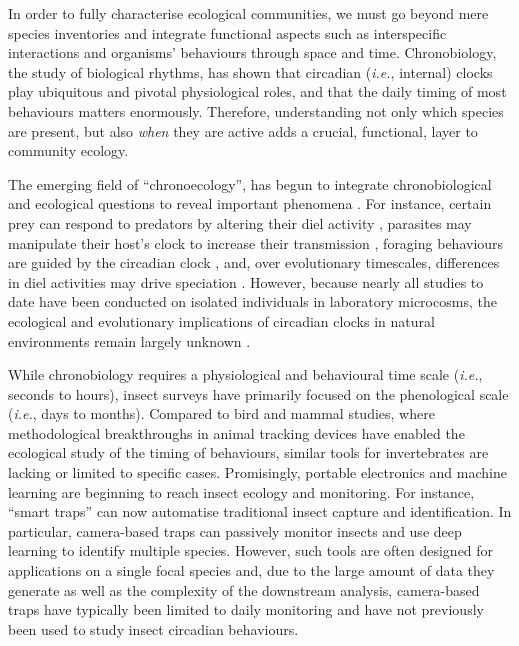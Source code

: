 \documentclass[12pt]{article}
\begin{document}
\begin{linenumbers}
		In order to fully characterise ecological communities, we must go beyond mere species inventories and integrate functional aspects such as interspecific interactions and organisms’ behaviours through space and time\cite{bro-jorgensen_linking_2019, cordero-rivera_behavioral_2017}. %
		Chronobiology, the study of biological rhythms, has shown that circadian (\emph{i.e.}, internal) clocks play ubiquitous and pivotal physiological roles, and that the daily timing of most behaviours matters enormously\cite{patke_molecular_2020}. Therefore, understanding not only which species are present, but also \emph{when} they are active adds a crucial, functional, layer to community ecology.
		
		The emerging field of “chronoecology”, has begun to integrate chronobiological and ecological questions to reveal important phenomena \cite{halle_chronoecology_2000,helm_two_2017}. For instance, certain prey can respond to predators by altering their diel activity \cite{van_der_veen_flexible_2017}, parasites may manipulate their host’s clock to increase their transmission \cite{westwood_evolutionary_2019}, foraging behaviours are guided by the circadian clock \cite{jain_time-restricted_2018}, and, over evolutionary timescales, differences in diel activities may drive speciation \cite{taylor_role_2017}. However, because nearly all studies to date have been conducted on isolated individuals in laboratory microcosms, the ecological and evolutionary implications of circadian clocks in natural environments remain largely unknown \cite{schwartz_wild_2017}.
		
		While chronobiology requires a physiological and behavioural time scale (\emph{i.e.}, seconds to hours), insect surveys have primarily focused on the phenological scale (\emph{i.e.}, days to months). Compared to bird and mammal studies, where methodological breakthroughs in animal tracking devices have enabled the ecological study of the timing of behaviours, similar tools for invertebrates are lacking\cite{dominoni_methods_2017} or limited to specific cases\cite{brydegaard_daily_2016,goldshtein_long-term_2021,nunes-silva_applications_2019}. Promisingly, portable electronics and machine learning are beginning to reach insect ecology and monitoring\cite{hoye_deep_2021}. For instance, “smart traps” can now automatise traditional insect capture and identification\cite{cardim_ferreira_lima_automatic_2020}. In particular, camera-based traps can passively monitor insects and use deep learning to identify multiple species. However, such tools are often designed for applications on a single focal species and, due to the large amount of data they generate as well as the complexity of the downstream analysis, camera-based traps have typically been limited to daily monitoring and have not previously been used to study insect circadian behaviours.
		

\end{linenumbers}
\end{document}
